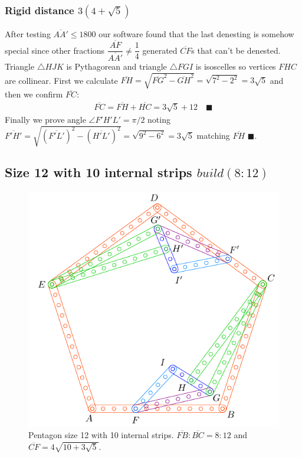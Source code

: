 \documentclass[11pt]{article}
\begin{document}
\subsubsection{Rigid distance $3(4 + \sqrt5)$}

After testing $\overline{AA'} \le 1800$ our software found that the last denesting is somehow special since other fractions $\dfrac{\overline{AF}}{\overline{AA'}} \neq \dfrac{1}4$ generated $\overline{CF}$s that can't be denested.
Triangle $\triangle{HJK}$ is Pythagorean and triangle $\triangle{FGI}$ is  isoscelles so vertices $FHC$ are collinear. First we calculate $\overline{FH} = \sqrt{\overline{FG}^2 - \overline{GH}^2} = \sqrt{7^2 - 2^2} = 3\sqrt5$ and then we confirm $\overline{FC}$:
\begin{align}
\overline{FC} = \overline{FH} + \overline{HC} = 3\sqrt{5} + 12 \quad \blacksquare
\end{align}
Finally we prove angle $\angle{F'H'L'} = \pi/2$ noting $\overline{F'H'} = \sqrt{(\overline{F'L'})^2 - (\overline{H'L'})^2} = \sqrt{9^2 - 6^2} = 3\sqrt5$ matching $\overline{FH}$ $\blacksquare$.

\subsection{Size 12 with 10 internal strips $build(8:12)$}

\begin{figure}[h]
 \centering
 \includegraphics[scale=1.1]{12/penta12-10b}
 \caption{Pentagon size 12 with 10 internal strips.  $\overline{FB}:\overline{BC} = 8:12$ and $\overline{CF} = 4\sqrt{10 + 3\sqrt5}$.}
 \label{fig:penta12-10b}
\end{figure}
\end{document}
